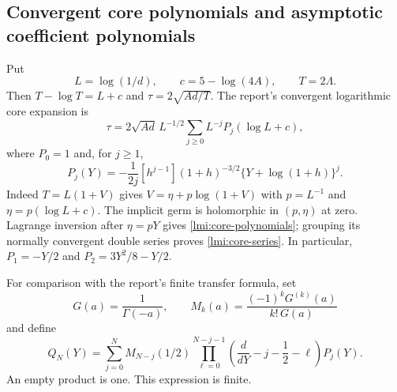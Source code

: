 \subsection{Convergent core polynomials and asymptotic coefficient polynomials}
Put
\[
 L=\log(1/d),\qquad c=5-\log(4A),\qquad T=2\Lambda .
\]
Then $T-\log T=L+c$ and $\tau=2\sqrt{Ad/T}$. The report's
convergent logarithmic core expansion is
\begin{equation}\label{lmi:core-series}
 \tau=2\sqrt{Ad}\,L^{-1/2}
       \sum_{j\ge0}L^{-j}P_j(\log L+c),
\end{equation}
where $P_0=1$ and, for $j\ge1$,
\begin{equation}\label{lmi:core-polynomials}
 P_j(Y)=-\frac1{2j}[h^{j-1}]
             (1+h)^{-3/2}\{Y+\log(1+h)\}^j.
\end{equation}
Indeed $T=L(1+V)$ gives
$V=\eta+p\log(1+V)$ with $p=L^{-1}$ and $\eta=p(\log L+c)$.
The implicit germ is holomorphic in $(p,\eta)$ at zero.
Lagrange inversion after $\eta=pY$ gives
\eqref{lmi:core-polynomials}; grouping its normally convergent
double series proves \eqref{lmi:core-series}. In particular,
$P_1=-Y/2$ and $P_2=3Y^2/8-Y/2$.

For comparison with the report's finite transfer formula, set
\[
 G(a)=\frac1{\Gamma(-a)},\qquad
 M_k(a)=\frac{(-1)^kG^{(k)}(a)}{k!\,G(a)}
\]
and define
\begin{equation}\label{lmi:transfer-polynomials}
 Q_N(Y)=\sum_{j=0}^N M_{N-j}(1/2)
       \prod_{\ell=0}^{N-j-1}
       \left(\frac{d}{dY}-j-\frac12-\ell\right)P_j(Y).
\end{equation}
An empty product is one. This expression is finite.

